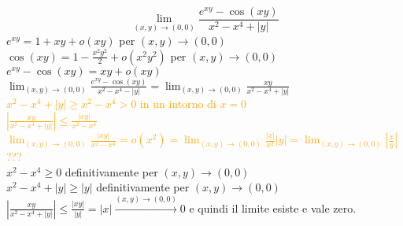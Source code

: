 \begin{exbar}
\begin{example}
	\begin{equation*}
		\lim_{(x,y)\rightarrow(0,0)}\frac{e^{xy}-\cos(xy)}{x^2-x^4+|y|}
	\end{equation*}
	$e^{xy}=1+xy+o(xy)$ per $(x,y)\rightarrow(0,0)$\\
	$\cos(xy)=1-\frac{x^2y^2}{2}+o(x^2y^2)$ per $(x,y)\rightarrow(0,0)$\\
	$e^{xy}-\cos(xy)=xy+o(xy)$\\
	$\lim_{(x,y)\rightarrow(0,0)}\frac{e^{xy}-\cos(xy)}{x^2-x^4-|y|}=\lim_{(x,y)\rightarrow(0,0)}\frac{xy}{x^2-x^4+|y|}$\\
	\textcolor{orange}{$x^2-x^4+|y|\geq x^2-x^4>0$ in un intorno di $x=0$\\
		$|\frac{xy}{x^2-x^4+|y|}|\leq \frac{|xy|}{x^2-x^4}$\\
		$\lim_{(x,y)\rightarrow(0,0)}\frac{|xy|}{x^2-x^4}=o(x^2)=\lim_{(x,y)\rightarrow(0,0)} \frac{|x|}{x^2}|y|=\lim_{(x,y)\rightarrow(0,0)} |\frac{x}{y}|$???}\\
	$x^2-x^4 \geq 0$ definitivamente per $(x,y)\rightarrow(0,0)$\\
	$x^2-x^4+|y|\geq |y|$ definitivamente per $(x,y)\rightarrow(0,0)$\\
	$|\frac{xy}{x^2-x^4+|y|}|\leq \frac{|xy|}{|y|}=|x|\xrightarrow{(x,y)\rightarrow(0,0)} 0$ e quindi il limite esiste e vale zero.
\end{example}
\end{exbar}




